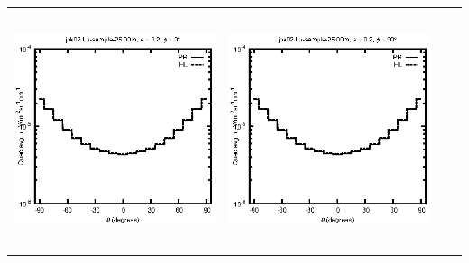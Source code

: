 \begin{tabular}{c c c c}
\includegraphics[height=7cm]{../eps/jok02_Lu_sample_25.00m_fwd.eps} &
\includegraphics[height=7cm]{../eps/jok02_Lu_sample_25.00m_cross.eps} \\
\end{tabular}

\pagebreak

